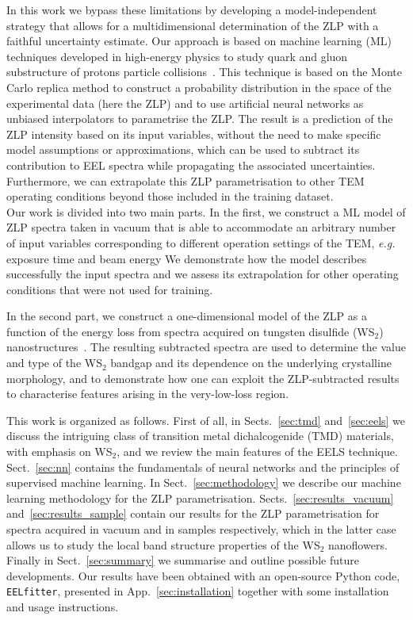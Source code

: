 In this work we bypass these limitations by developing a model-independent strategy
that allows for a multidimensional determination of the ZLP
with a faithful uncertainty estimate.
%
Our approach is based on machine learning (ML) techniques
developed in high-energy physics to study
quark and gluon substructure of protons
particle collisions~\cite{Ball:2008by,Ball:2012cx,Ball:2014uwa,Ball:2017nwa}.
%
This technique is based on the Monte Carlo replica method to construct a probability
distribution in the space of the experimental data (here the ZLP) and to use artificial
neural networks as unbiased interpolators to parametrise the ZLP.
%
The result is
a prediction of the ZLP intensity based on its input variables,
without the need to make specific model assumptions or approximations,
which can be used to subtract its contribution to EEL spectra while
propagating the associated uncertainties.
%
Furthermore, we can extrapolate this ZLP parametrisation to other TEM
operating conditions beyond those included in the training dataset.\\

Our work is divided into two main parts.
%
In the first, we construct a ML model of ZLP spectra taken
in vacuum that is able to accommodate an arbitrary number of input
variables corresponding to different operation settings of the TEM, 
{\it e.g.} exposure time and beam energy
%
We demonstrate how the model describes successfully the
input spectra and we assess its extrapolation for other operating
conditions that were not used for training.

In the second part, we construct a one-dimensional model
of the ZLP as a function of the energy loss from spectra acquired on
tungsten disulfide (WS$_2$) nanostructures~\cite{SabryaWS2}.
%
The resulting subtracted spectra are used to determine
the value and type of the WS$_2$ bandgap
and its dependence on the underlying crystalline morphology, 
and to demonstrate how one can exploit the ZLP-subtracted results
to characterise features arising in the very-low-loss region.

This work is organized as follows.
%
First of all, in Sects.~\ref{sec:tmd} and~\ref{sec:eels}
we discuss the intriguing class of transition metal 
dichalcogenide (TMD) materials, with emphasis on WS$_2$,
and we review the main features of the EELS technique.
%
Sect.~\ref{sec:nn} contains
the fundamentals of neural networks and the principles
of supervised machine learning.
%
In Sect.~\ref{sec:methodology} we describe our machine learning methodology
for the ZLP parametrisation.
%
Sects.~\ref{sec:results_vacuum} and~\ref{sec:results_sample} contain
our results for the ZLP parametrisation for spectra acquired
in vacuum and in samples respectively, which in the latter
case allows us to study the local band structure properties
of the WS$_2$ nanoflowers.
%
Finally in Sect.~\ref{sec:summary} we summarise
and outline possible future developments.
%
Our results have been obtained with an open-source {\sc Python} code,
{\tt EELfitter}, presented in App.~\ref{sec:installation}
together with some installation and usage instructions.
